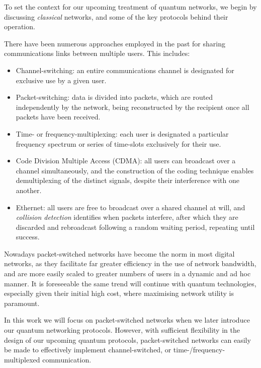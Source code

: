 \documentclass[aps, rmp, twocolumn, amsmath, amssymb, nofootinbib, superscriptaddress, longbibliography, floatfix, table-of-contents, eqsecnum]{revtex4-1}
\begin{document}
To set the context for our upcoming treatment of quantum networks, we begin by discussing \textit{classical} networks, and some of the key protocols behind their operation.

There have been numerous approaches employed in the past for sharing communications links between multiple users. This includes:
\begin{itemize}
	\item Channel-switching: an entire communications channel is designated for exclusive use by a given user. 
	\item Packet-switching: data is divided into packets, which are routed independently by the network, being reconstructed by the recipient once all packets have been received.
	\item Time- or frequency-multiplexing: each user is designated a particular frequency spectrum or series of time-slots exclusively for their use. 
	\item Code Division Multiple Access (CDMA): all users can broadcast over a channel simultaneously, and the construction of the coding technique enables demultiplexing of the distinct signals, despite their interference with one another.
	\item Ethernet: all users are free to broadcast over a shared channel at will, and \textit{collision detection} identifies when packets interfere, after which they are discarded and rebroadcast following a random waiting period, repeating until success.
\end{itemize}

Nowadays packet-switched networks have become the norm in most digital networks, as they facilitate far greater efficiency in the use of network bandwidth, and are more easily scaled to greater numbers of users in a dynamic and ad hoc manner. It is foreseeable the same trend will continue with quantum technologies, especially given their initial high cost, where maximising network utility is paramount.

In this work we will focus on packet-switched networks when we later introduce our quantum networking protocols. However, with sufficient flexibility in the design of our upcoming quantum protocols, packet-switched networks can easily be made to effectively implement channel-switched, or time-/frequency-multiplexed communication.
\end{document}
